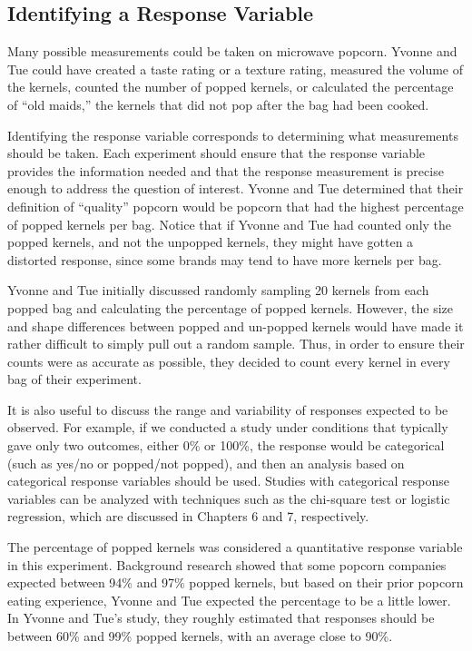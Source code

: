 \documentclass[
]{report}
\begin{document}
\hypertarget{identifying-a-response-variable}{%
\subsection*{Identifying a Response Variable}\label{identifying-a-response-variable}}

Many possible measurements could be taken on microwave popcorn. Yvonne and Tue could have created a taste rating or a texture rating, measured the volume of the kernels, counted the number of popped kernels, or calculated the percentage of ``old maids,'' the kernels that did not pop after the bag had been cooked.

Identifying the response variable corresponds to determining what measurements should be taken. Each experiment should ensure that the response variable provides the information needed and that the response measurement is precise enough to address the question of interest. Yvonne and Tue determined that their definition of ``quality'' popcorn would be popcorn that had the highest percentage of popped kernels per bag. Notice that if Yvonne and Tue had counted only the popped kernels, and not the unpopped kernels, they might have gotten a distorted response, since some brands may tend to have more kernels per bag.

Yvonne and Tue initially discussed randomly sampling 20 kernels from each popped bag and calculating the percentage of popped kernels. However, the size and shape differences between popped and un-popped kernels would have made it rather difficult to simply pull out a random sample. Thus, in order to ensure their counts were as accurate as possible, they decided to count every kernel in every bag of their experiment.

It is also useful to discuss the range and variability of responses expected to be observed. For example, if we conducted a study under conditions that typically gave only two outcomes, either 0\% or 100\%, the response would be categorical (such as yes/no or popped/not popped), and then an analysis based on categorical response variables should be used. Studies with categorical response variables can be analyzed with techniques such as the chi-square test or logistic regression, which are discussed in Chapters 6 and 7, respectively.

The percentage of popped kernels was considered a quantitative response variable in this experiment. Background research showed that some popcorn companies expected between 94\% and 97\% popped kernels, but based on their prior popcorn eating experience, Yvonne and Tue expected the percentage to be a little lower. In Yvonne and Tue's study, they roughly estimated that responses should be between 60\% and 99\% popped kernels, with an average close to 90\%.
\end{document}

